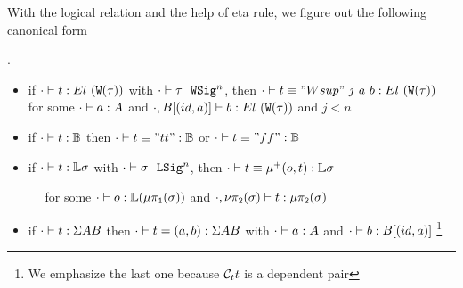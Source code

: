 With the logical relation and the help of eta rule, we figure out the following canonical form
\begin{theorem}.
  \begin{itemize}
    \item if $ {\cdot} \vdash {t} : {El~(\texttt{W}({\tau}))} $ with $ {\cdot} \vdash {\tau} \ \ \texttt{WSig}^{n} $, then $ {\cdot} \vdash {t \equiv "Wsup"~j~a~b} : {El~(\texttt{W}({\tau}))} $ for some $ {\cdot} \vdash {a} : {A} $ and $ {\cdot, B[(id, a)]} \vdash {b} : {El~(\texttt{W}({\tau}))} $ and $j < n$
    \item if $ {\cdot} \vdash {t} : {\mathbb{B}} $ then $ {\cdot} \vdash {t \equiv "tt"} : {\mathbb{B}} $ or $ {\cdot} \vdash {t \equiv "ff"} : {\mathbb{B}} $ 
    \item if $ {\cdot} \vdash {t} : {\mathbb{L}\sigma} $ with $ {\cdot} \vdash {\sigma} \ \ \texttt{LSig}^{n} $, then $ {\cdot} \vdash {t \equiv \ensuremath{\mu^+({o},{t})}} : {\mathbb{L}\sigma} $ 
    
      $\quad$ for some $ {\cdot} \vdash {o} : {\mathbb{L}(\mu\pi_{\texttt{1}}({\sigma}))} $ and $ {\cdot, \nu\pi_{\texttt{2}}({\sigma})} \vdash {t} : {\mu\pi_{\texttt{2}}({\sigma})} $
    \item if $ {\cdot} \vdash {t} : {\Sigma A B} $ then $ {\cdot} \vdash {t = (a, b)} : {\Sigma A B} $ with $ {\cdot} \vdash {a} : {A} $ and $ {\cdot} \vdash {b} : {B[(id, a)]} $
    \footnote{We emphasize the last one because $\mathcal{C}_t t$ is a dependent pair}
  \end{itemize}
\end{theorem}

